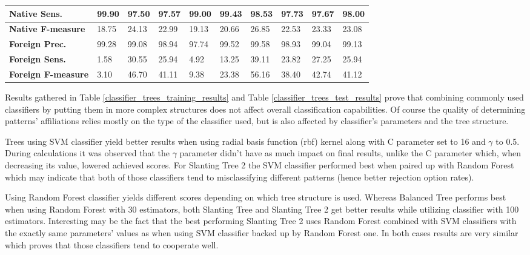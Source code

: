 \begin{table}[htp]
{\begin{tabular}{l|l|l|l|l|l|l|l|l|l|}
			\multicolumn{1}{|l|}{\textbf{Native Sens.}}        & 99.90         & 97.50         & 97.57       & 99.00         & 99.43         & 98.53       & 97.73          & 97.67         & 98.00        \\ \hline
			\multicolumn{1}{|l|}{\textbf{Native F-measure}}          & 18.75         & 24.13         & 22.99       & 19.13         & 20.66         & 26.85       & 22.53          & 23.33         & 23.08        \\ \hline
			\multicolumn{1}{|l|}{\textbf{Foreign Prec.}}         & 99.28         & 99.08         & 98.94       & 97.74         & 99.52         & 99.58       & 98.93          & 99.04         & 99.13        \\ \hline
			\multicolumn{1}{|l|}{\textbf{Foreign Sens.}}       & 1.58          & 30.55         & 25.94       & 4.92          & 13.25         & 39.11       & 23.82          & 27.25         & 25.94        \\ \hline
			\multicolumn{1}{|l|}{\textbf{Foreign F-measure}}         & 3.10          & 46.70         & 41.11       & 9.38          & 23.38         & 56.16       & 38.40          & 42.74         & 41.12        \\ \hline
		\end{tabular}
	}
\end{table}

Results gathered in Table \ref{classifier_trees_training_results} and Table \ref{classifier_trees_test_results} prove that combining commonly used classifiers by putting them in more complex structures does not affect overall classification capabilities. Of course the quality of determining patterns' affiliations relies mostly on the type of the classifier used, but is also affected by classifier's parameters and the tree structure. 

Trees using SVM classifier yield better results when using radial basis function (rbf) kernel along with C parameter set to 16 and $\gamma$ to 0.5. During calculations it was observed that the $\gamma$ parameter didn't have as much impact on final results, unlike the C parameter which, when decreasing its value, lowered achieved scores. For Slanting Tree 2 the SVM classifier performed best when paired up with Random Forest which may indicate that both of those classifiers tend to misclassifying different patterns (hence better rejection option rates).

Using Random Forest classifier yields different scores depending on which tree structure is used. Whereas Balanced Tree performs best when using Random Forest with 30 estimators, both Slanting Tree and Slanting Tree 2 get better results while utilizing classifier with 100 estimators. Interesting may be the fact that the best performing Slanting Tree 2 uses Random Forest combined with SVM classifiers with the exactly same parameters' values as when using SVM classifier backed up by Random Forest one. In both cases results are very similar which proves that those classifiers tend to cooperate well.

